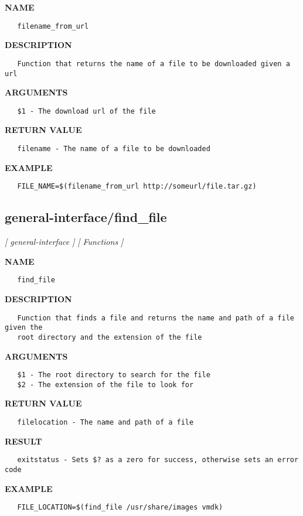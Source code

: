 \label{ch:robo22}
\label{ch:general_interface_filename_from_url}
\textbf{NAME}
\begin{verbatim}
   filename_from_url
\end{verbatim}
\textbf{DESCRIPTION}
\begin{verbatim}
   Function that returns the name of a file to be downloaded given a url
\end{verbatim}
\textbf{ARGUMENTS}
\begin{verbatim}
   $1 - The download url of the file
\end{verbatim}
\textbf{RETURN VALUE}
\begin{verbatim}
   filename - The name of a file to be downloaded
\end{verbatim}
\textbf{EXAMPLE}
\begin{verbatim}
   FILE_NAME=$(filename_from_url http://someurl/file.tar.gz)
\end{verbatim}
\newpage
\subsection{general-interface/find\_file}
\textsl{[ general-interface ]}
\textsl{[ Functions ]}

\label{ch:robo23}
\label{ch:general_interface_find_file}
\textbf{NAME}
\begin{verbatim}
   find_file
\end{verbatim}
\textbf{DESCRIPTION}
\begin{verbatim}
   Function that finds a file and returns the name and path of a file given the 
   root directory and the extension of the file
\end{verbatim}
\textbf{ARGUMENTS}
\begin{verbatim}
   $1 - The root directory to search for the file
   $2 - The extension of the file to look for
\end{verbatim}
\textbf{RETURN VALUE}
\begin{verbatim}
   filelocation - The name and path of a file
\end{verbatim}
\textbf{RESULT}
\begin{verbatim}
   exitstatus - Sets $? as a zero for success, otherwise sets an error code
\end{verbatim}
\textbf{EXAMPLE}
\begin{verbatim}
   FILE_LOCATION=$(find_file /usr/share/images vmdk)
\end{verbatim}
\newpage
